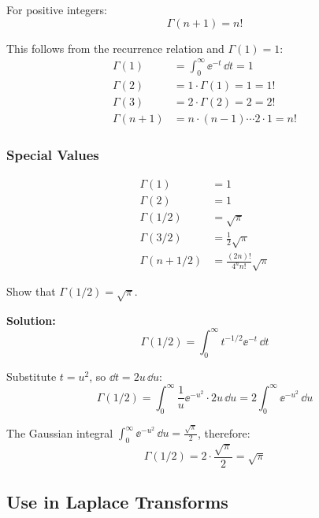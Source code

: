 For positive integers:
\begin{equation}
\boxed{\Gamma(n+1) = n!}
\end{equation}

This follows from the recurrence relation and $\Gamma(1) = 1$:
\begin{align}
\Gamma(1) &= \int_0^\infty \ee^{-t} \, \dd t = 1 \\
\Gamma(2) &= 1 \cdot \Gamma(1) = 1 = 1! \\
\Gamma(3) &= 2 \cdot \Gamma(2) = 2 = 2! \\
\Gamma(n+1) &= n \cdot (n-1) \cdots 2 \cdot 1 = n!
\end{align}

\subsubsection{Special Values}

\begin{align}
\Gamma(1) &= 1 \\
\Gamma(2) &= 1 \\
\Gamma(1/2) &= \sqrt{\pi} \\
\Gamma(3/2) &= \frac{1}{2}\sqrt{\pi} \\
\Gamma(n+1/2) &= \frac{(2n)!}{4^n n!}\sqrt{\pi}
\end{align}

\begin{examplebox}[title=Example 10.3: Computing $\Gamma(1/2)$]
Show that $\Gamma(1/2) = \sqrt{\pi}$.

\textbf{Solution:}
\begin{equation}
\Gamma(1/2) = \int_0^\infty t^{-1/2}\ee^{-t} \, \dd t
\end{equation}

Substitute $t = u^2$, so $\dd t = 2u\,\dd u$:
\begin{equation}
\Gamma(1/2) = \int_0^\infty \frac{1}{u}\ee^{-u^2} \cdot 2u \, \dd u = 2\int_0^\infty \ee^{-u^2} \, \dd u
\end{equation}

The Gaussian integral $\int_0^\infty \ee^{-u^2} \, \dd u = \frac{\sqrt{\pi}}{2}$, therefore:
\begin{equation}
\boxed{\Gamma(1/2) = 2 \cdot \frac{\sqrt{\pi}}{2} = \sqrt{\pi}}
\end{equation}
\end{examplebox}

\subsection{Use in Laplace Transforms}

